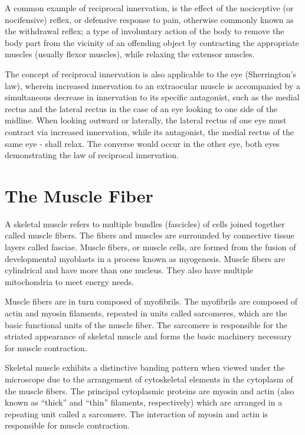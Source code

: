 \documentclass[]{book}
\begin{document}
A common example of reciprocal innervation, is the effect of the nociceptive (or nocifensive) reflex, or defensive response to pain, otherwise commonly known as the withdrawal reflex; a type of involuntary action of the body to remove the body part from the vicinity of an offending object by contracting the appropriate muscles (usually flexor muscles), while relaxing the extensor muscles.

The concept of reciprocal innervation is also applicable to the eye (Sherrington's law), wherein increased innervation to an extraocular muscle is accompanied by a simultaneous decrease in innervation to its specific antagonist, such as the medial rectus and the lateral rectus in the case of an eye looking to one side of the midline. When looking outward or laterally, the lateral rectus of one eye must contract via increased innervation, while its antagonist, the medial rectus of the same eye - shall relax. The converse would occur in the other eye, both eyes demonstrating the law of reciprocal innervation.

\hypertarget{the-muscle-fiber}{%
\section{The Muscle Fiber}\label{the-muscle-fiber}}

A skeletal muscle refers to multiple bundles (fascicles) of cells joined together called muscle fibers. The fibers and muscles are surrounded by connective tissue layers called fasciae. Muscle fibers, or muscle cells, are formed from the fusion of developmental myoblasts in a process known as myogenesis. Muscle fibers are cylindrical and have more than one nucleus. They also have multiple mitochondria to meet energy needs.

Muscle fibers are in turn composed of myofibrils. The myofibrils are composed of actin and myosin filaments, repeated in units called sarcomeres, which are the basic functional units of the muscle fiber. The sarcomere is responsible for the striated appearance of skeletal muscle and forms the basic machinery necessary for muscle contraction.

Skeletal muscle exhibits a distinctive banding pattern when viewed under the microscope due to the arrangement of cytoskeletal elements in the cytoplasm of the muscle fibers. The principal cytoplasmic proteins are myosin and actin (also known as ``thick'' and ``thin'' filaments, respectively) which are arranged in a repeating unit called a sarcomere. The interaction of myosin and actin is responsible for muscle contraction.
\end{document}
